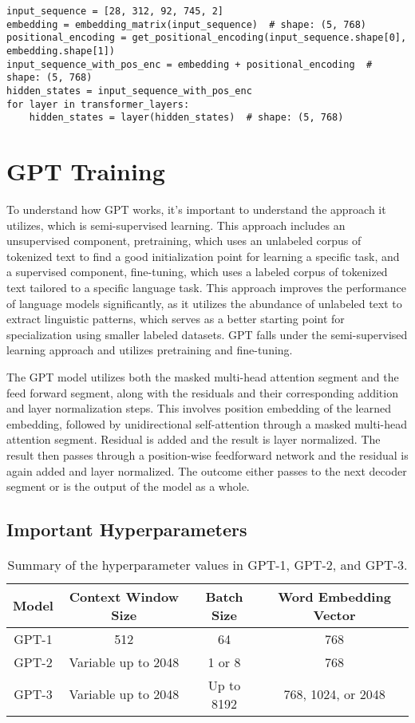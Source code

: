 \documentclass[
	11pt,
	a4paper,
	figtabcapt,
]{oblivoir}
\begin{document}
\begin{verbatim}
input_sequence = [28, 312, 92, 745, 2]
embedding = embedding_matrix(input_sequence)  # shape: (5, 768)
positional_encoding = get_positional_encoding(input_sequence.shape[0], embedding.shape[1])
input_sequence_with_pos_enc = embedding + positional_encoding  # shape: (5, 768)
hidden_states = input_sequence_with_pos_enc
for layer in transformer_layers:
    hidden_states = layer(hidden_states)  # shape: (5, 768)
\end{verbatim}

\section{GPT Training}\label{sec:training}
To understand how GPT works, it's important to understand the approach it utilizes, which is semi-supervised learning.
This approach includes an unsupervised component, pretraining, which uses an unlabeled corpus of tokenized text to find a good initialization point for learning a specific task, and a supervised component, fine-tuning, which uses a labeled corpus of tokenized text tailored to a specific language task.
This approach improves the performance of language models significantly, as it utilizes the abundance of unlabeled text to extract linguistic patterns, which serves as a better starting point for specialization using smaller labeled datasets.
GPT falls under the semi-supervised learning approach and utilizes pretraining and fine-tuning.

The GPT model utilizes both the masked multi-head attention segment and the feed forward segment, along with the residuals and their corresponding addition and layer normalization steps.
This involves position embedding of the learned embedding, followed by unidirectional self-attention through a masked multi-head attention segment. Residual is added and the result is layer normalized. The result then passes through a position-wise feedforward network and the residual is again added and layer normalized.
The outcome either passes to the next decoder segment or is the output of the model as a whole.


\subsection{Important Hyperparameters}
\begin{table}[h]
	\centering
	\begin{tabular}{|c|c|c|c|}
	\hline
	Model & Context Window Size & Batch Size & Word Embedding Vector \\
	\hline
	GPT-1 & 512 & 64 & 768 \\
	\hline
	GPT-2 & Variable up to 2048 & 1 or 8 & 768 \\
	\hline
	GPT-3 & Variable up to 2048 & Up to 8192 & 768, 1024, or 2048 \\
	\hline
	\end{tabular}
	\caption{Summary of the hyperparameter values in GPT-1, GPT-2, and GPT-3.}
\end{table}
	
\end{document}

